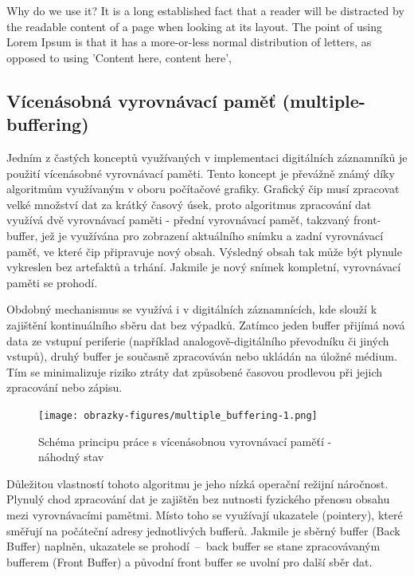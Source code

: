 Why do we use it?
It is a long established fact that a reader will be distracted by the readable content of a page when looking at its layout. The point of using Lorem Ipsum is that it has a more-or-less normal distribution of letters, as opposed to using 'Content here, content here', 

\subsection{Vícenásobná vyrovnávací paměť (multiple-buffering)}
Jedním z častých konceptů využívaných v implementaci digitálních záznamníků je použití vícenásobné vyrovnávací paměti. Tento koncept je převážně známý díky algoritmům využívaným v oboru 
počítačové grafiky. Grafický čip musí zpracovat velké množství dat za krátký časový úsek, proto algoritmus zpracování dat využívá dvě vyrovnávací paměti - přední vyrovnávací paměť, takzvaný 
front-buffer, jež je využívána pro zobrazení aktuálního snímku a zadní vyrovnávací paměť, ve které čip připravuje nový obsah. Výsledný obsah tak může být plynule vykreslen bez artefaktů a 
trhání. Jakmile je nový snímek kompletní, vyrovnávací paměti se prohodí. \cite{double_buffering_model}

Obdobný mechanismus se využívá i v digitálních záznamnících, kde slouží k zajištění kontinuálního sběru dat bez výpadků. Zatímco jeden buffer přijímá nová data ze vstupní periferie 
(například analogově-digitálního převodníku či jiných vstupů), druhý buffer je současně zpracováván nebo ukládán na úložné médium. Tím se minimalizuje riziko ztráty dat způsobené časovou 
prodlevou při jejich zpracování nebo zápisu.

\begin{figure}[h]
    \centering
    \texttt{[image: obrazky-figures/multiple\_buffering-1.png]}
    
    \caption{Schéma principu práce s vícenásobnou vyrovnávací paměťí - náhodný stav}
    \label{fig:multiple-buffering-1}
\end{figure}

Důležitou vlastností tohoto algoritmu je jeho nízká operační režijní náročnost. Plynulý chod zpracování dat je zajištěn bez nutnosti fyzického přenosu obsahu mezi vyrovnávacími pamětmi. 
Místo toho se využívají ukazatele (pointery), které směřují na počáteční adresy jednotlivých bufferů. Jakmile je sběrný buffer (Back Buffer) naplněn, ukazatele se prohodí~–~back buffer se 
stane zpracovávaným bufferem (Front Buffer) a původní front buffer se uvolní pro další sběr dat.

